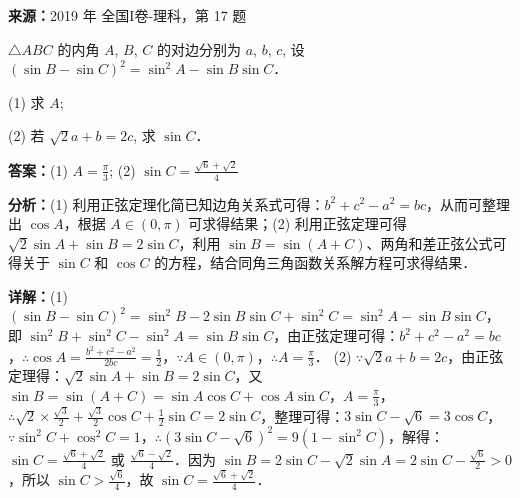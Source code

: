 \begin{question}[points=12]
\textbf{来源：}2019 年 全国I卷-理科，第 17 题\par
$\triangle ABC$ 的内角 $A$, $B$, $C$ 的对边分别为 $a$, $b$, $c$, 设 $(\sin B - \sin C)^2 = \sin^2 A - \sin B \sin C$．

(1) 求 $A$;

(2) 若 $\sqrt{2}a + b = 2c$, 求 $\sin C$．
\begin{solution}
\textbf{答案：}(1) $A = \frac{\pi}{3}$; (2) $\sin C = \frac{\sqrt{6} + \sqrt{2}}{4}$

\textbf{分析：}(1) 利用正弦定理化简已知边角关系式可得：$b^2 + c^2 - a^2 = bc$，从而可整理出 $\cos A$，根据 $A \in (0, \pi)$ 可求得结果；(2) 利用正弦定理可得 $\sqrt{2}\sin A + \sin B = 2\sin C$，利用 $\sin B = \sin(A + C)$、两角和差正弦公式可得关于 $\sin C$ 和 $\cos C$ 的方程，结合同角三角函数关系解方程可求得结果．

\textbf{详解：}(1) $(\sin B - \sin C)^2 = \sin^2 B - 2\sin B\sin C + \sin^2 C = \sin^2 A - \sin B\sin C$，即 $\sin^2 B + \sin^2 C - \sin^2 A = \sin B\sin C$，由正弦定理可得：$b^2 + c^2 - a^2 = bc$，$\therefore \cos A = \frac{b^2 + c^2 - a^2}{2bc} = \frac{1}{2}$，$\because A \in (0, \pi)$，$\therefore A = \frac{\pi}{3}$．
(2) $\because \sqrt{2}a + b = 2c$，由正弦定理得：$\sqrt{2}\sin A + \sin B = 2\sin C$，又 $\sin B = \sin(A + C) = \sin A \cos C + \cos A \sin C$，$A = \frac{\pi}{3}$，$\therefore \sqrt{2} \times \frac{\sqrt{3}}{2} + \frac{\sqrt{3}}{2}\cos C + \frac{1}{2}\sin C = 2\sin C$，整理可得：$3\sin C - \sqrt{6} = 3\cos C$，$\because \sin^2 C + \cos^2 C = 1$，$\therefore (3\sin C - \sqrt{6})^2 = 9(1 - \sin^2 C)$，解得：$\sin C = \frac{\sqrt{6} + \sqrt{2}}{4}$ 或 $\frac{\sqrt{6} - \sqrt{2}}{4}$．因为 $\sin B = 2\sin C - \sqrt{2}\sin A = 2\sin C - \frac{\sqrt{6}}{2} > 0$，所以 $\sin C > \frac{\sqrt{6}}{4}$，故 $\sin C = \frac{\sqrt{6} + \sqrt{2}}{4}$．
\end{solution}
\end{question}

